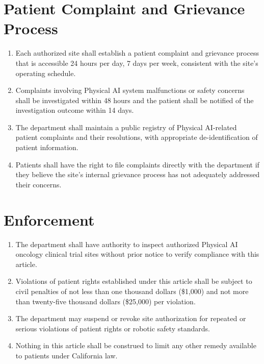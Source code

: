 \documentclass[11pt,letterpaper]{article}
\begin{document}
\section{Patient Complaint and Grievance Process}

\begin{enumerate}[label=(\alph*)]
\item Each authorized site shall establish a patient complaint and grievance
  process that is accessible 24 hours per day, 7 days per week, consistent
  with the site's operating schedule.

\item Complaints involving Physical AI system malfunctions or safety concerns
  shall be investigated within 48 hours and the patient shall be notified of
  the investigation outcome within 14 days.

\item The department shall maintain a public registry of Physical AI-related
  patient complaints and their resolutions, with appropriate de-identification
  of patient information.

\item Patients shall have the right to file complaints directly with the
  department if they believe the site's internal grievance process has not
  adequately addressed their concerns.
\end{enumerate}

\section{Enforcement}

\begin{enumerate}[label=(\alph*)]
\item The department shall have authority to inspect authorized Physical AI
  oncology clinical trial sites without prior notice to verify compliance
  with this article.

\item Violations of patient rights established under this article shall be
  subject to civil penalties of not less than one thousand dollars (\$1,000)
  and not more than twenty-five thousand dollars (\$25,000) per violation.

\item The department may suspend or revoke site authorization for repeated or
  serious violations of patient rights or robotic safety standards.

\item Nothing in this article shall be construed to limit any other remedy
  available to patients under California law.
\end{enumerate}
\end{document}
